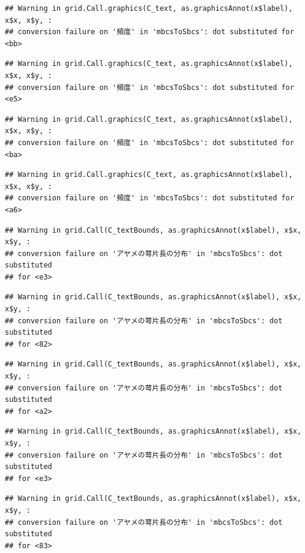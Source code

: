 \documentclass[
]{book}
\begin{document}
\begin{verbatim}
## Warning in grid.Call.graphics(C_text, as.graphicsAnnot(x$label), x$x, x$y, :
## conversion failure on '頻度' in 'mbcsToSbcs': dot substituted for <bb>
\end{verbatim}

\begin{verbatim}
## Warning in grid.Call.graphics(C_text, as.graphicsAnnot(x$label), x$x, x$y, :
## conversion failure on '頻度' in 'mbcsToSbcs': dot substituted for <e5>
\end{verbatim}

\begin{verbatim}
## Warning in grid.Call.graphics(C_text, as.graphicsAnnot(x$label), x$x, x$y, :
## conversion failure on '頻度' in 'mbcsToSbcs': dot substituted for <ba>
\end{verbatim}

\begin{verbatim}
## Warning in grid.Call.graphics(C_text, as.graphicsAnnot(x$label), x$x, x$y, :
## conversion failure on '頻度' in 'mbcsToSbcs': dot substituted for <a6>
\end{verbatim}

\begin{verbatim}
## Warning in grid.Call(C_textBounds, as.graphicsAnnot(x$label), x$x, x$y, :
## conversion failure on 'アヤメの萼片長の分布' in 'mbcsToSbcs': dot substituted
## for <e3>
\end{verbatim}

\begin{verbatim}
## Warning in grid.Call(C_textBounds, as.graphicsAnnot(x$label), x$x, x$y, :
## conversion failure on 'アヤメの萼片長の分布' in 'mbcsToSbcs': dot substituted
## for <82>
\end{verbatim}

\begin{verbatim}
## Warning in grid.Call(C_textBounds, as.graphicsAnnot(x$label), x$x, x$y, :
## conversion failure on 'アヤメの萼片長の分布' in 'mbcsToSbcs': dot substituted
## for <a2>
\end{verbatim}

\begin{verbatim}
## Warning in grid.Call(C_textBounds, as.graphicsAnnot(x$label), x$x, x$y, :
## conversion failure on 'アヤメの萼片長の分布' in 'mbcsToSbcs': dot substituted
## for <e3>
\end{verbatim}

\begin{verbatim}
## Warning in grid.Call(C_textBounds, as.graphicsAnnot(x$label), x$x, x$y, :
## conversion failure on 'アヤメの萼片長の分布' in 'mbcsToSbcs': dot substituted
## for <83>
\end{verbatim}
\end{document}
